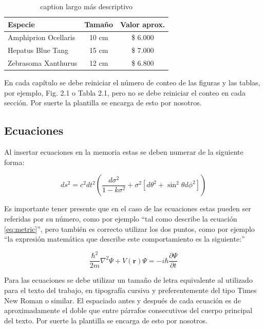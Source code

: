 \begin{table}[h]
	\centering
	\caption[caption cto]{caption largo más descriptivo}
	\begin{tabular}{l c c}    
		\toprule
		\textbf{Especie} 	 & \textbf{Tamaño}  & \textbf{Valor aprox.}  \\
		\midrule
		Amphiprion Ocellaris	 & 10 cm 			& \$ 6.000 \\		
		Hepatus Blue Tang	 & 15 cm				& \$ 7.000 \\
		Zebrasoma Xanthurus	 & 12 cm				& \$ 6.800 \\
		\bottomrule
		\hline
	\end{tabular}
	\label{tab:peces}
\end{table}

En cada capítulo se debe reiniciar el número de conteo de las figuras y las tablas, por ejemplo, Fig. 2.1 o Tabla 2.1, pero no se debe reiniciar el conteo en cada sección. Por suerte la plantilla se encarga de esto por nosotros.

\subsection{Ecuaciones}
\label{sec:Ecuaciones}

Al insertar ecuaciones en la memoria estas se deben numerar de la siguiente forma:

\begin{equation}
	\label{eq:metric}
	ds^2 = c^2 dt^2 \left( \frac{d\sigma^2}{1-k\sigma^2} + \sigma^2\left[ d\theta^2 + \sin^2\theta d\phi^2 \right] \right)
\end{equation}
                                                        
Es importante tener presente que en el caso de las ecuaciones estas pueden ser referidas por su número, como por ejemplo ``tal como describe la ecuación \ref{eq:metric}'', pero también es correcto utilizar los dos puntos, como por ejemplo ``la expresión matemática que describe este comportamiento es la siguiente:''

\begin{equation}
	\label{eq:schrodinger}
	\frac{\hbar^2}{2m}\nabla^2\Psi + V(\mathbf{r})\Psi = -i\hbar \frac{\partial\Psi}{\partial t}
\end{equation}

Para las ecuaciones se debe utilizar un tamaño de letra equivalente al utilizado para el texto del trabajo, en tipografía cursiva y preferentemente del tipo Times New Roman o similar. El espaciado antes y después de cada ecuación es de aproximadamente el doble que entre párrafos consecutivos del cuerpo principal del texto. Por suerte la plantilla se encarga de esto por nosotros.

